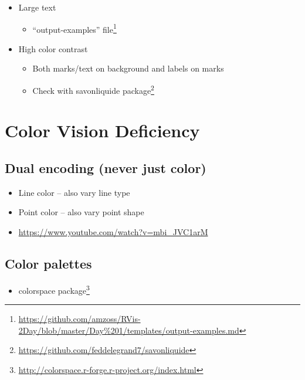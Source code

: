 \documentclass[
]{krantz}
\providecommand{\tightlist}{%
  \setlength{\itemsep}{0pt}\setlength{\parskip}{0pt}}
\renewcommand{\href}[2]{#2\footnote{\url{#1}}}
\begin{document}
\begin{itemize}
\item
  Large text

  \begin{itemize}
  \tightlist
  \item
    \href{https://github.com/amzoss/RVis-2Day/blob/master/Day\%201/templates/output-examples.md}{``output-examples'' file}
  \end{itemize}
\item
  High color contrast

  \begin{itemize}
  \item
    Both marks/text on background and labels on marks
  \item
    Check with \href{https://github.com/feddelegrand7/savonliquide}{savonliquide package}
  \end{itemize}
\end{itemize}

\hypertarget{color-vision-deficiency}{%
\section{Color Vision Deficiency}\label{color-vision-deficiency}}

\hypertarget{dual-encoding-never-just-color}{%
\subsection{Dual encoding (never just color)}\label{dual-encoding-never-just-color}}

\begin{itemize}
\item
  Line color -- also vary line type
\item
  Point color -- also vary point shape
\item
  \url{https://www.youtube.com/watch?v=mbi_JVC1arM}
\end{itemize}

\hypertarget{color-palettes}{%
\subsection{Color palettes}\label{color-palettes}}

\begin{itemize}
\tightlist
\item
  \href{http://colorspace.r-forge.r-project.org/index.html}{colorspace package}
\end{itemize}
\end{document}
